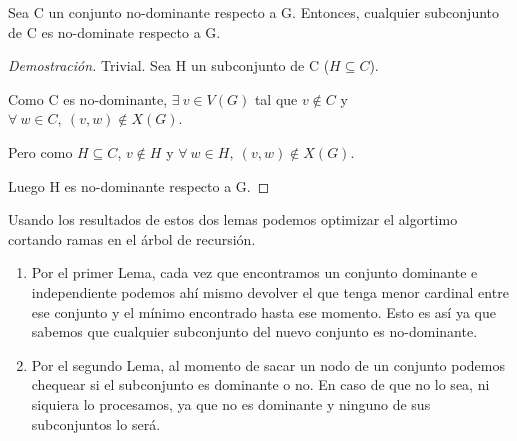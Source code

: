     \begin{lemma}
        Sea C un conjunto no-dominante respecto a G. Entonces, cualquier subconjunto de C es no-dominate respecto a G.
    \end{lemma}
    \begin{proof}[Demostración]
        Trivial. Sea H un subconjunto de C ($H \subseteq C$).

        Como C es no-dominante, $\exists\ v \in V(G)$ tal que $v \notin C$ y $\forall\ w \in C,\ (v,w) \notin X(G)$.

        Pero como $H \subseteq C$, $v \notin H$ y $\forall\ w \in H,\ (v,w) \notin X(G)$.

        Luego H es no-dominante respecto a G.
    \end{proof}

    Usando los resultados de estos dos lemas podemos optimizar el algortimo cortando ramas en el árbol de recursión.
    \begin{enumerate}
        \item Por el primer Lema, cada vez que encontramos un conjunto dominante e independiente podemos ahí mismo devolver el que tenga menor cardinal entre ese conjunto y el mínimo encontrado hasta ese momento. Esto es así ya que sabemos que cualquier subconjunto del nuevo conjunto es no-dominante.
        \item Por el segundo Lema, al momento de sacar un nodo de un conjunto podemos chequear si el subconjunto es dominante o no. En caso de que no lo sea, ni siquiera lo procesamos, ya que no es dominante y ninguno de sus subconjuntos lo será.
    \end{enumerate}
